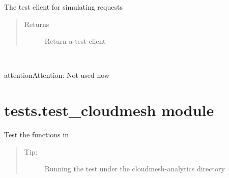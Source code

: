 \documentclass[letterpaper,10pt,english]{sphinxmanual}
\begin{document}

\begin{fulllineitems}
\label{\detokenize{tests:tests.conftest.client}}
The test client for simulating requests
\begin{quote}\begin{description}
\item[{Returns}] \leavevmode
Return a test client

\end{description}\end{quote}

\end{fulllineitems}


\begin{fulllineitems}
\label{\detokenize{tests:tests.conftest.runner}}~
\begin{sphinxadmonition}{attention}{Attention:}
Not used now
\end{sphinxadmonition}

\end{fulllineitems}



\section{tests.test\_cloudmesh module}
\label{\detokenize{tests:module-tests.test_cloudmesh}}\label{\detokenize{tests:tests-test-cloudmesh-module}}
Test the functions in {\hyperref[\detokenize{cloudmesh.analytics:module-cloudmesh.analytics.analytics}]{}}
\begin{quote}
\begin{description}
\item[{Tip:}] \leavevmode
Running the test under the cloudmesh-analytics directory


\end{description}
\end{quote}
\end{document}
